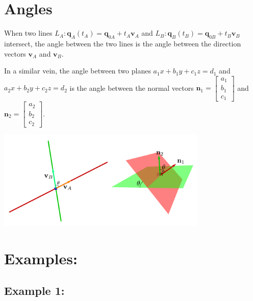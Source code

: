 \documentclass{article}
\begin{document}
\section*{Angles}

When two lines \(L_A : \mathbf{q}_A(t_A) = \mathbf{q}_{0A} + t_A \mathbf{v}_A\) and \(L_B : \mathbf{q}_B(t_B) = \mathbf{q}_{0B} + t_B \mathbf{v}_B\) intersect, the angle between the two lines is the angle between the direction vectors \(\mathbf{v}_A\) and \(\mathbf{v}_B\). 

In a similar vein, the angle between two planes \(a_1 x + b_1 y + c_1 z = d_1\) and \(a_2 x + b_2 y + c_2 z = d_2\) is the angle between the normal vectors \(\mathbf{n}_1 = \begin{bmatrix} a_1 \\ b_1 \\ c_1 \end{bmatrix}\) and \(\mathbf{n}_2 = \begin{bmatrix} a_2 \\ b_2 \\ c_2 \end{bmatrix}\). 

\begin{center}
\includegraphics[width = 0.75\textwidth]{line_and_plane_angles} 
\end{center}




\section*{Examples:}

\subsection*{Example 1:}
\end{document}
